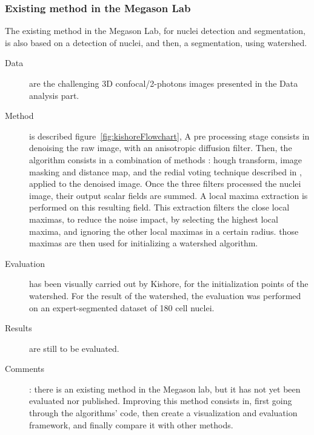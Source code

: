 \subsubsection{Existing method in the Megason Lab}
\label{sect:megasonExisting}
The existing method in the Megason Lab, for nuclei detection and segmentation, is also based on a detection of nuclei, and then, a segmentation, using watershed.
  \begin{description}
  \item[Data] are the challenging 3D confocal/2-photons images presented in the Data analysis part. 
  \item[Method] is described figure~\ref{fig:kishoreFlowchart},
  A pre processing stage consists in denoising the raw image, with an anisotropic diffusion filter.
  Then, the algorithm consists in a combination of methods : 
  hough transform, image masking and distance map, and the redial voting technique described in \cite{chang2007segmentation}, applied to the denoised image.
  Once the three filters processed the nuclei image, their output scalar fields are summed.
  A local maxima extraction is performed on this resulting field.
  This extraction filters the close local maximas, to reduce the noise impact, by selecting the highest local maxima, and ignoring the other local maximas in a certain radius.
  those maximas are then used for initializing a watershed algorithm.
  \item[Evaluation] has been visually carried out by Kishore, for the initialization points of the watershed.
  For the result of the watershed, the evaluation was performed on an expert-segmented dataset of 180 cell nuclei.
  \item[Results] are still to be evaluated.
  \item[Comments]: there is an existing method in the Megason lab, but it has not yet been evaluated nor published. Improving this method consists in, first going through the algorithms' code, then create a visualization and evaluation framework, and finally compare it with other methods.
\end{description}
